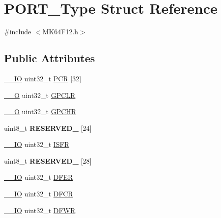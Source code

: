 \hypertarget{structPORT__Type}{}\section{P\+O\+R\+T\+\_\+\+Type Struct Reference}
\label{structPORT__Type}


{\ttfamily \#include $<$M\+K64\+F12.\+h$>$}

\subsection*{Public Attributes}
\begin{DoxyCompactItemize}
\item 
\hyperlink{core__sc300_8h_aec43007d9998a0a0e01faede4133d6be}{\+\_\+\+\_\+\+IO} uint32\+\_\+t \hyperlink{structPORT__Type_ab03f2583d716b3619bfddb05060a0d72}{P\+CR} \mbox{[}32\mbox{]}
\item 
\hyperlink{core__sc300_8h_a7e25d9380f9ef903923964322e71f2f6}{\+\_\+\+\_\+O} uint32\+\_\+t \hyperlink{structPORT__Type_ab4eae4ee06e554db6797dbbcf67f9655}{G\+P\+C\+LR}
\item 
\hyperlink{core__sc300_8h_a7e25d9380f9ef903923964322e71f2f6}{\+\_\+\+\_\+O} uint32\+\_\+t \hyperlink{structPORT__Type_adb92b388adf5799a5a59817ae6cbf7d1}{G\+P\+C\+HR}
\item 
uint8\+\_\+t {\bfseries R\+E\+S\+E\+R\+V\+E\+D\+\_} \mbox{[}24\mbox{]}\hypertarget{structPORT__Type_ae0b23fc576160e68eef755da60ad2467}{}\label{structPORT__Type_ae0b23fc576160e68eef755da60ad2467}

\item 
\hyperlink{core__sc300_8h_aec43007d9998a0a0e01faede4133d6be}{\+\_\+\+\_\+\+IO} uint32\+\_\+t \hyperlink{structPORT__Type_a20069f4ac88fc12066ba90eea8fcbb58}{I\+S\+FR}
\item 
uint8\+\_\+t {\bfseries R\+E\+S\+E\+R\+V\+E\+D\+\_} \mbox{[}28\mbox{]}\hypertarget{structPORT__Type_a721a0f49b9c9e67f336a174837e7c066}{}\label{structPORT__Type_a721a0f49b9c9e67f336a174837e7c066}

\item 
\hyperlink{core__sc300_8h_aec43007d9998a0a0e01faede4133d6be}{\+\_\+\+\_\+\+IO} uint32\+\_\+t \hyperlink{structPORT__Type_a5fd39916c06d54202f0dc1a50b5e1041}{D\+F\+ER}
\item 
\hyperlink{core__sc300_8h_aec43007d9998a0a0e01faede4133d6be}{\+\_\+\+\_\+\+IO} uint32\+\_\+t \hyperlink{structPORT__Type_a8d4e0a725169fa8fe22fe55a3d3311a0}{D\+F\+CR}
\item 
\hyperlink{core__sc300_8h_aec43007d9998a0a0e01faede4133d6be}{\+\_\+\+\_\+\+IO} uint32\+\_\+t \hyperlink{structPORT__Type_af58c3f35d9f1036282d4e4edabfb77c2}{D\+F\+WR}
\end{DoxyCompactItemize}


